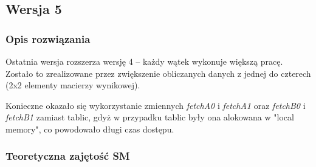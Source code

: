 \subsection{Wersja 5}

\subsubsection{Opis rozwiązania}

Ostatnia wersja rozszerza wersję 4 -- każdy wątek wykonuje większą pracę. Zostało to zrealizowane przez zwiększenie obliczanych danych z jednej do czterech (2x2 elementy macierzy wynikowej).



Konieczne okazało się wykorzystanie zmiennych \emph{fetchA0} i \emph{fetchA1} oraz \emph{fetchB0} i \emph{fetchB1} zamiast tablic, gdyż w przypadku tablic były ona alokowana w "local memory", co powodowało długi czas dostępu.

\subsubsection{Teoretyczna zajętość SM}

\begin{center}
\begin{table}[H]
\centering
{}
\caption{Teoretyczna zajętość SM -- wersja 5.}
\end{table}
\end{center}

